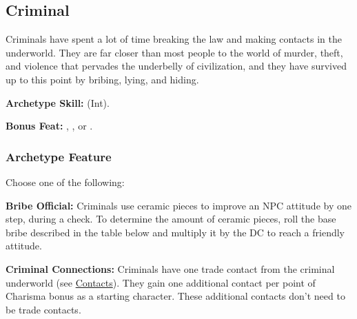 \subsection{Criminal}
Criminals have spent a lot of time breaking the law and making contacts in the underworld. They are far closer than most people to the world of murder, theft, and violence that pervades the underbelly of civilization, and they have survived up to this point by bribing, lying, and hiding.

\textbf{Archetype Skill:}  (Int).

\textbf{Bonus Feat:} , , or .

\subsubsection{Archetype Feature}
Choose one of the following:

\textbf{Bribe Official:} Criminals use ceramic pieces to improve an NPC attitude by one step, during a  check. To determine the amount of ceramic pieces, roll the base bribe described in the table below and multiply it by the  DC to reach a friendly attitude.



\textbf{Criminal Connections:} Criminals have one trade contact from the criminal underworld (see \hyperref[sec:contacts]{Contacts}). They gain one additional contact per point of Charisma bonus as a starting character. These additional contacts don't need to be trade contacts.
